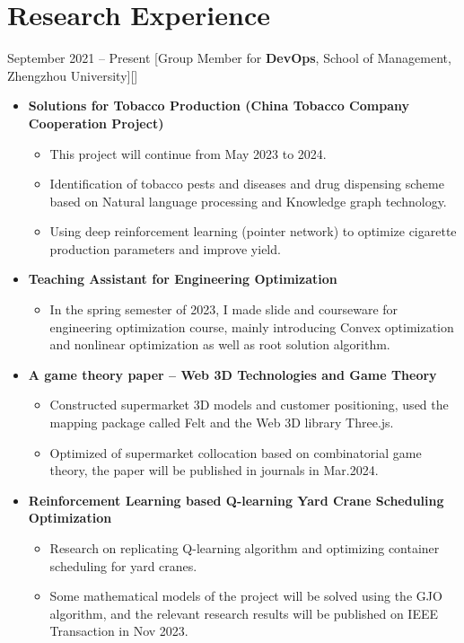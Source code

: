 \documentclass{chicv}
\begin{document}
\section{Research Experience}
  {September 2021 -- Present}
  [Group Member for \textbf{DevOps}, School of Management, Zhengzhou University][]
    \begin{itemize}
      \item \textbf{Solutions for Tobacco Production (China Tobacco Company Cooperation Project)}
        \begin{itemize}
          \item This project will continue from May 2023 to 2024.
          \item Identification of tobacco pests and diseases and drug dispensing scheme based on Natural language processing and Knowledge graph technology.
          \item Using deep reinforcement learning (pointer network) to optimize cigarette production parameters and improve yield.
        \end{itemize}
      \item \textbf{Teaching Assistant for Engineering Optimization}  
        \begin{itemize}
          \item In the spring semester of 2023, I made slide and courseware for engineering optimization course, mainly introducing Convex optimization and nonlinear optimization as well as root solution algorithm.
        \end{itemize}
      \item \textbf{A game theory paper -- Web 3D Technologies and Game Theory}
        \begin{itemize}
          \item Constructed supermarket 3D models and customer positioning, used the mapping package called Felt and the Web 3D library Three.js.
          \item Optimized of supermarket collocation based on combinatorial game theory, the paper will be published in journals in Mar.2024.
        \end{itemize}
      \item \textbf{Reinforcement Learning based Q-learning Yard Crane Scheduling Optimization}
        \begin{itemize}
          \item Research on replicating Q-learning algorithm and optimizing container scheduling for yard cranes.
          \item Some mathematical models of the project will be solved using the GJO algorithm, and the relevant research results will be published on IEEE Transaction in Nov 2023.
        \end{itemize}
    \end{itemize}
%
%
%
%
\end{document}
